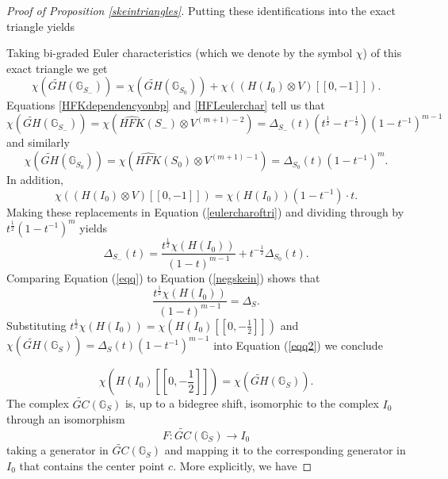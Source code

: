\documentclass[11pt]{amsart}
\theoremstyle{definition}
\theoremstyle{remark}
\def\HFK {\mathit{HFK}}
\newcommand\HFKhat{\widehat{\HFK}}
\numberwithin{equation}{section}
\begin{document}
\begin{proof}[Proof of Proposition \ref{skeintriangles}]
Putting these identifications into the exact triangle yields
\begin{center}
\end{center}

Taking bi-graded Euler characteristics (which we denote by the symbol $\chi$) of this exact triangle we get
\begin{equation}\label{eulercharoftri}\chi(\widetilde{GH}(\mathbb{G}_{S_-}))=\chi(\widetilde{GH}(\mathbb{G}_{S_0}))+\chi((H(I_0)\otimes V)[[0,-1]]).\end{equation}
Equations \ref{HFKdependencyonbp} and \ref{HFLeulerchar} tell us that\[\chi(\widetilde{GH}(\mathbb{G}_{S_-}))= \chi(\HFKhat(S_-)\otimes V^{(m+1)-2})=\Delta_{S_-}(t)(t^{\frac{1}{2}}-t^{-\frac{1}{2}})(1-t^{-1})^{m-1}\]
and similarly 
\[\chi(\widetilde{GH}(\mathbb{G}_{S_0}))=\chi(\HFKhat(S_0)\otimes V^{(m+1)-1})=\Delta_{S_0}(t)(1-t^{-1})^{m}.\]In addition,
\[\chi((H(I_0)\otimes V)[[0,-1]])=\chi(H(I_0))(1-t^{-1})\cdot t.\]
Making these replacements in Equation (\ref{eulercharoftri}) and dividing through by $t^{\frac{1}{2}}(1-t^{-1})^m$ yields
\begin{equation}\label{eqq}
    \Delta_{S_-}(t)=\frac{t^{\frac{1}{2}}\chi(H(I_0))}{(1-t)^{m-1}}+t^{-\frac{1}{2}}\Delta_{S_0}(t).
\end{equation}
Comparing Equation (\ref{eqq}) to Equation (\ref{negskein}) shows that \begin{equation}\label{eqq2}\frac{t^{\frac{1}{2}}\chi(H(I_0))}{(1-t)^{m-1}}=\Delta_{S}.\end{equation}
Substituting $t^{\frac{1}{2}}\chi(H(I_0))=\chi(H(I_0)[[0,-\frac{1}{2}]])$ and $\chi(\widetilde{GH}(\mathbb{G}_S))=\Delta_S(t)(1-t^{-1})^{m-1}$ into Equation (\ref{eqq2}) we conclude

\begin{equation}\label{eulerchars}
    \chi(H(I_0)[[0,-\frac{1}{2}]])=\chi(\widetilde{GH}(\mathbb{G}_S)).
\end{equation}
The complex $\widetilde{GC}(\mathbb{G}_S)$ is, up to a bidegree shift, isomorphic to the complex $I_0$ through an isomorphism \[F\colon \widetilde{GC}(\mathbb{G}_S)\to I_0\] taking a generator in $\widetilde{GC}(\mathbb{G}_S)$ and mapping it to the corresponding generator in $I_0$ that contains the center point $c$. More explicitly, we have


\end{proof}
\end{document}
